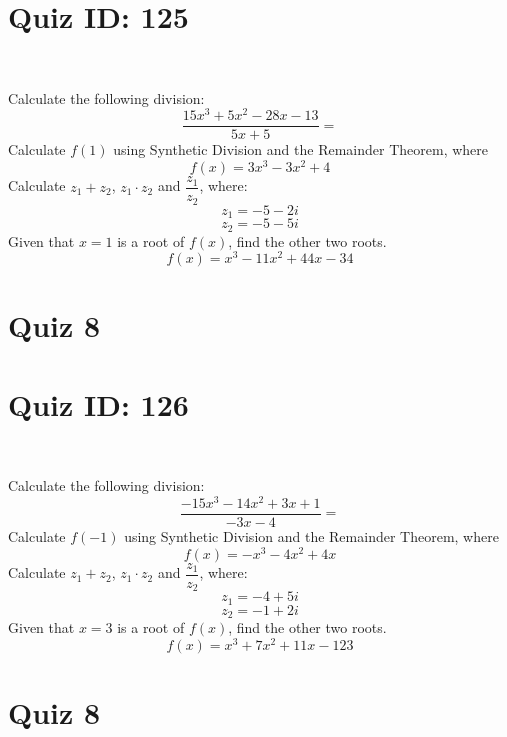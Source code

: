 \documentclass{exam}
\begin{document}
\section*{Quiz ID: 125}
\vspace{0.5cm}\
\vspace{1cm}\
\begin{questions}
\question Calculate the following division:\[\dfrac{
15x^3 + 5x^2 - 28x - 13}{
5x + 5}=\] \makeemptybox{\stretch{2}}
\question Calculate $f(1)$ using Synthetic Division and the Remainder Theorem, where\[f(x) = 
3x^3 - 3x^2 + 4\]
\newpage\question Calculate $z_1+z_2$, $z_1\cdot z_2$ and $\dfrac{z_1}{z_2}$, where:\[z_1=-5-2\mathit{i}\]\[z_2=-5-5\mathit{i}\]
\question Given that $x=1$ is a root of $f(x)$, find the other two roots.\[f(x)=
x^3 - 11x^2 + 44x - 34\]\makeemptybox{\stretch{1}}
\end{questions}\newpage
\newpage
\section*{Quiz 8}
\section*{Quiz ID: 126}
\vspace{0.5cm}\
\vspace{1cm}\
\begin{questions}
\question Calculate the following division:\[\dfrac{
-15x^3 - 14x^2 + 3x + 1}{
-3x - 4}=\] 
\question Calculate $f(-1)$ using Synthetic Division and the Remainder Theorem, where\[f(x) = 
-x^3 - 4x^2 + 4x\]
\newpage\question Calculate $z_1+z_2$, $z_1\cdot z_2$ and $\dfrac{z_1}{z_2}$, where:\[z_1=-4+5\mathit{i}\]\[z_2=-1+2\mathit{i}\]\makeemptybox{\stretch{1}}
\question Given that $x=3$ is a root of $f(x)$, find the other two roots.\[f(x)=
x^3 + 7x^2 + 11x - 123\]\makeemptybox{\stretch{1}}
\end{questions}\newpage
\newpage
\section*{Quiz 8}
\end{document}
